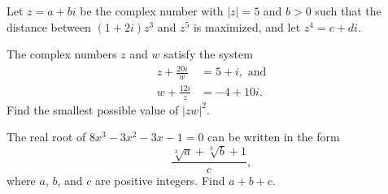 \documentclass[11pt]{article}
\theoremstyle{definition}
\begin{document}
\begin{question}[name={2012 AIME II, \href{https://artofproblemsolving.com/community/c4p2644130}{Problem 6}}]
	Let $z = a + bi$ be the complex number with $|z| = 5$ and $b > 0$ such that the distance between $(1 + 2i)z^3$ and $z^5$ is maximized, and let $z^4 = c + di$.
\end{question}




%	










\begin{question}[name={2012 AIME II, \href{https://artofproblemsolving.com/community/c4p2644147}{Problem 8}}]
	The complex numbers $z$ and $w$ satisfy the system
	\begin{align*}
		z+\frac{20i}{w}&=5+i, \text{ and}\\w+\frac{12i}{z}&=-4+10i.
	\end{align*}
	Find the smallest possible value of $|zw|^2$.
\end{question}


%	





















\begin{question}[name={2013 AIME I, \href{https://artofproblemsolving.com/community/c4p2969809}{Problem 5}}]
	The real root of $8x^3 - 3x^2 - 3x - 1 = 0$ can be written in the form $$\frac{\sqrt[3]a + \sqrt[3]b + 1}{c},$$ where $a$, $b$, and $c$ are positive integers. Find $a+b+c$.
\end{question}


%	
\end{document}
